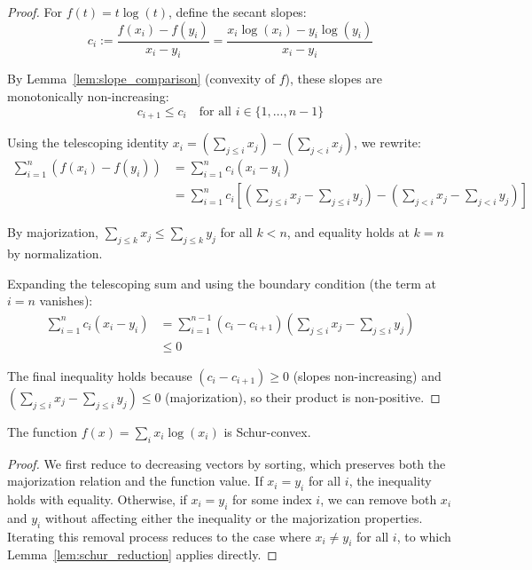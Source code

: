 \begin{proof}
For $f(t) = t \log(t)$, define the secant slopes:
$$c_i := \frac{f(x_i) - f(y_i)}{x_i - y_i} = \frac{x_i \log(x_i) - y_i \log(y_i)}{x_i - y_i}$$

By Lemma~\ref{lem:slope_comparison} (convexity of $f$), these slopes are monotonically non-increasing:
$$c_{i+1} \leq c_i \quad \text{for all } i \in \{1, \ldots, n-1\}$$

Using the telescoping identity $x_i = \left(\sum_{j \leq i} x_j\right) - \left(\sum_{j < i} x_j\right)$, we rewrite:
\begin{align*}
\sum_{i=1}^n (f(x_i) - f(y_i)) 
&= \sum_{i=1}^n c_i (x_i - y_i) \\
&= \sum_{i=1}^n c_i \left[\left(\sum_{j \leq i} x_j - \sum_{j \leq i} y_j\right) - \left(\sum_{j < i} x_j - \sum_{j < i} y_j\right)\right]
\end{align*}

By majorization, $\sum_{j \leq k} x_j \leq \sum_{j \leq k} y_j$ for all $k < n$, and equality holds at $k = n$ by normalization.

Expanding the telescoping sum and using the boundary condition (the term at $i = n$ vanishes):
\begin{align*}
\sum_{i=1}^n c_i (x_i - y_i) 
&= \sum_{i=1}^{n-1} (c_i - c_{i+1}) \left(\sum_{j \leq i} x_j - \sum_{j \leq i} y_j\right) \\
&\leq 0
\end{align*}

The final inequality holds because $(c_i - c_{i+1}) \geq 0$ (slopes non-increasing) and 
$\left(\sum_{j \leq i} x_j - \sum_{j \leq i} y_j\right) \leq 0$ (majorization), so their product is non-positive.
\end{proof}

\begin{proposition}
\label{thm:schur_convex_xlogx}
\leanok
{}
The function $f(x) = \sum_i x_i \log(x_i)$ is Schur-convex.
\end{proposition}

\begin{proof}
We first reduce to decreasing vectors by sorting, which preserves both the majorization relation and the function value. 
If $x_i = y_i$ for all $i$, the inequality holds with equality. Otherwise, if $x_i = y_i$ for some index $i$, we can 
remove both $x_i$ and $y_i$ without affecting either the inequality or the majorization properties. Iterating this 
removal process reduces to the case where $x_i \neq y_i$ for all $i$, to which Lemma~\ref{lem:schur_reduction} applies 
directly.
\end{proof}

